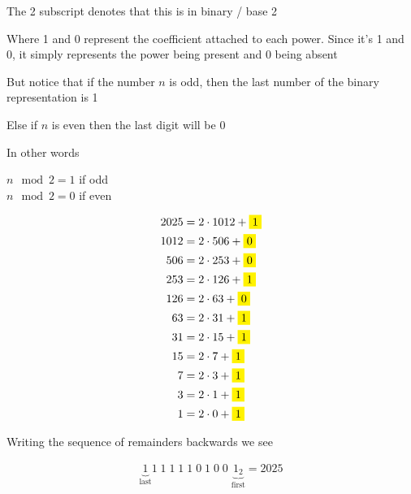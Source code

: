 \documentclass[../../Main.tex]{subfiles}
\begin{document}
\begin{work}
    \begin{note}
        The 2 subscript denotes that this is in binary / base 2
    \end{note}

    Where 1 and 0 represent the coefficient attached to each power. Since it's 1 and 0, it simply represents the power being present and 0 being absent

    But notice that if the number $n$ is odd, then the last number of the binary representation is 1

    Else if $n$ is even then the last digit will be 0

    In other words

    \begin{center}
        $n \mod{2} = 1$ if odd \\
        $n \mod{2} = 0$ if even \\
    \end{center}

    \begin{align*}
        2025 &= 2 \cdot 1012 + \yellowbox{1} \\
        1012 &= 2 \cdot 506 + \yellowbox{0} \\
        506 &= 2 \cdot 253 + \yellowbox{0} \\
        253 &= 2 \cdot 126 + \yellowbox{1} \\
        126 &= 2 \cdot 63 + \yellowbox{0} \\
        63 &= 2 \cdot 31 + \yellowbox{1} \\
        31 &= 2 \cdot 15 + \yellowbox{1} \\
        15 &= 2 \cdot 7 + \yellowbox{1} \\
        7 &= 2 \cdot 3 + \yellowbox{1} \\
        3 &= 2 \cdot 1 + \yellowbox{1} \\
        1 &= 2 \cdot 0 + \yellowbox{1} \\
    \end{align*}

    Writing the sequence of remainders backwards we see

    \begin{align*}
        \underbrace{1}_{\text{last}}
        1 \;
        1 \;
        1 \;
        1 \;
        1 \;
        0 \;
        1 \;
        0 \;
        0 \;
        \underbrace{1_2}_{\text{first}}
        = 2025
    \end{align*}

\end{work}
\end{document}
